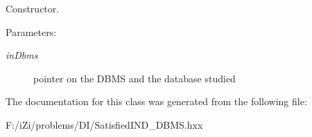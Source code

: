 Constructor. 

\begin{Desc}
\item[Parameters:]
\begin{description}
\item[{\em in\-Dbms}]pointer on the DBMS and the database studied \end{description}
\end{Desc}


The documentation for this class was generated from the following file:\begin{CompactItemize}
\item 
F:/i\-Zi/problems/DI/Satisfied\-IND\_\-DBMS.hxx\end{CompactItemize}
